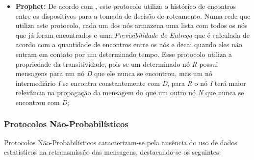 \begin{itemize}
    \item \textbf{Prophet:} De acordo com \cite{lindgren2003probabilistic}, este protocolo utiliza o histórico de encontros entre os dispositivos para a tomada de decisão de roteamento. Numa rede que utiliza este protocolo, cada um dos nós armazena uma lista com todos os nós que já foram encontrados e uma \emph{Previsibilidade de Entrega} que é calculada de acordo com a quantidade de encontros entre os nós e decai quando eles não entram em contato por um determinado tempo. Esse protocolo utiliza a propriedade da transitividade, pois se um determinado nó \emph{R} possui mensagens para um nó \emph{D} que ele nunca se encontrou, mas um nó intermediário \emph{I} se encontra constantemente com \emph{D}, para \emph{R} o nó \emph{I} terá maior relevância na propagação da mensagem do que um outro nó \emph{N} que nunca se encontrou com \emph{D};
\end{itemize}

\newpage

\subsubsection{Protocolos Não-Probabilísticos}

Protocolos Não-Probabilísticos caracterizam-se pela ausência do uso de dados estatísticos na retransmissão das mensagens, destacando-se os seguintes:

